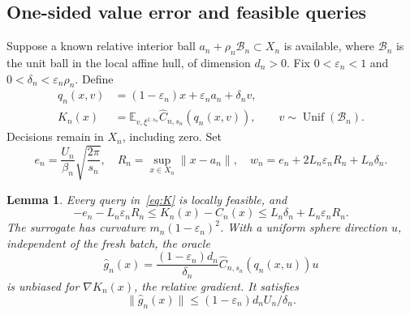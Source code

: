 \documentclass{article}
\newtheorem{lemma}[theorem]{Lemma}
\begin{document}
\subsection{One-sided value error and feasible queries}
Suppose a known relative interior ball
\(a_n+\rho_n\mathcal B_n\subset X_n\) is available, where
\(\mathcal B_n\) is the unit ball in the local affine hull, of dimension
\(d_n>0\). Fix \(0<\varepsilon_n<1\) and
\(0<\delta_n<\varepsilon_n\rho_n\). Define
\begin{align}
 q_n(x,v)&=(1-\varepsilon_n)x+\varepsilon_na_n+\delta_nv,\\
 K_n(x)&=\mathbb E_{v,\xi^{1:s_n}}\widehat C_{n,s_n}(q_n(x,v)),
 \qquad v\sim\operatorname{Unif}(\mathcal B_n).\label{eq:K}
\end{align}
Decisions remain in \(X_n\), including zero. Set
\begin{equation}\label{eq:error-constants}
 e_n=\frac{U_n}{\beta_n}\sqrt{\frac{2\pi}{s_n}},\quad
 R_n=\sup_{x\in X_n}\|x-a_n\|,\quad
 w_n=e_n+2L_n\varepsilon_nR_n+L_n\delta_n.
\end{equation}
\begin{lemma}\label{lem:oracle}
Every query in~\eqref{eq:K} is locally feasible, and
\begin{equation}\label{eq:interval}
 -e_n-L_n\varepsilon_nR_n\le K_n(x)-C_n(x)
 \le L_n\delta_n+L_n\varepsilon_nR_n.
\end{equation}
The surrogate has curvature \(m_n(1-\varepsilon_n)^2\). With a uniform
sphere direction \(u\), independent of the fresh batch, the oracle
\begin{equation}\label{eq:oracle}
 \widehat g_n(x)=\frac{(1-\varepsilon_n)d_n}{\delta_n}
 \widehat C_{n,s_n}(q_n(x,u))u
\end{equation}
is unbiased for \(\nabla K_n(x)\), the relative gradient. It satisfies
\[
 \|\widehat g_n(x)\|\le (1-\varepsilon_n)d_nU_n/\delta_n.
\]
\end{lemma}
\end{document}
